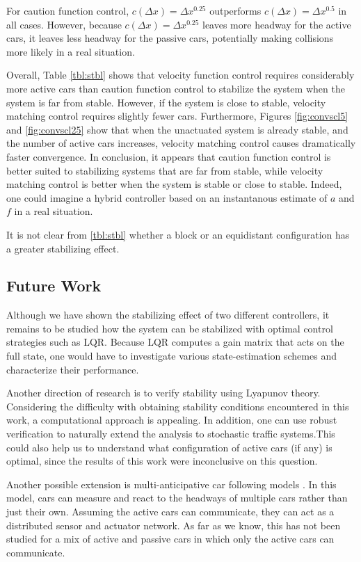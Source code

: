 \documentclass[10pt,twocolumn]{article}
\theoremstyle{ss}
\begin{document}
For caution function control, $c(\Delta x)=\Delta x^{0.25}$ outperforms $c(\Delta x)=\Delta x^{0.5}$ in all cases. However, because $c(\Delta x)=\Delta x^{0.25}$ leaves more headway for the active cars, it leaves less headway for the passive cars, potentially making collisions more likely in a real situation.

Overall, Table \ref{tbl:stbl} shows that velocity function control requires considerably more active cars than caution function control to stabilize the system when the system is far from stable. However, if the system is close to stable, velocity matching control requires slightly fewer cars. Furthermore, Figures \ref{fig:convscl5} and \ref{fig:convscl25} show that when the unactuated system is already stable, and the number of active cars increases, velocity matching control causes dramatically faster convergence. In conclusion, it appears that caution function control is better suited to stabilizing systems that are far from stable, while velocity matching control is better when the system is stable or close to stable. Indeed, one could imagine a hybrid controller based on an instantanous estimate of $a$ and $f$ in a real situation.

It is not clear from \ref{tbl:stbl} whether a block or an equidistant configuration has a greater stabilizing effect.

\subsection{Future Work}
Although we have shown the stabilizing effect of two different controllers, it remains to be studied how the system can be stabilized with optimal control strategies such as LQR. Because LQR computes a gain matrix that acts on the full state, one would have to investigate various state-estimation schemes and characterize their performance. 

Another direction of research is to verify stability using Lyapunov theory. Considering the difficulty with obtaining stability conditions encountered in this work, a computational approach is appealing. In addition, one can use robust verification to naturally extend the analysis to stochastic traffic systems.This could also help us to understand what configuration of active cars (if any) is optimal, since the results of this work were inconclusive on this question.
 
Another possible extension is multi-anticipative car following models \cite{Lenz}. In this model, cars can measure and react to the headways of multiple cars rather than just their own. Assuming the active cars can communicate, they can act as a distributed sensor and actuator network. As far as we know, this has not been studied for a mix of active and passive cars in which only the active cars can communicate.
\end{document}
